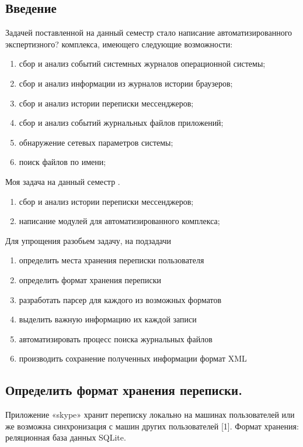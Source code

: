 \newpage

\subsection{Введение}

Задачей поставленной на данный семестр стало написание автоматизированного экспертизного? комплекса, имеющего следующие возможности: 

\begin{enumerate}
\item сбор и анализ событий системных журналов операционной системы;
\item сбор и анализ информации из журналов истории браузеров;
\item сбор и анализ истории переписки мессенджеров;
\item сбор и анализ событий журнальных файлов приложений;
\item обнаружение сетевых параметров системы;
\item поиск файлов по имени;
\end{enumerate}

Моя задача на данный семестр . 

\begin{enumerate}
\item сбор и анализ истории переписки мессенджеров;
\item написание модулей для автоматизированного комплекса;
\end{enumerate}

Для упрощения разобьем задачу, на подзадачи
\begin{enumerate}
\item определить места хранения переписки пользователя
\item определить формат хранения переписки
\item разработать парсер для каждого из возможных форматов
\item выделить важную информацию их каждой записи
\item автоматизировать процесс поиска журнальных файлов
\item производить сохранение полученных информации формат XML
\end{enumerate}

\subsection{Определить формат хранения переписки.}

Приложение «skype» хранит переписку локально на машинах пользователей или же возможна синхронизация с машин других пользователей [1]. Формат хранения: реляционная база данных SQLite.\\

